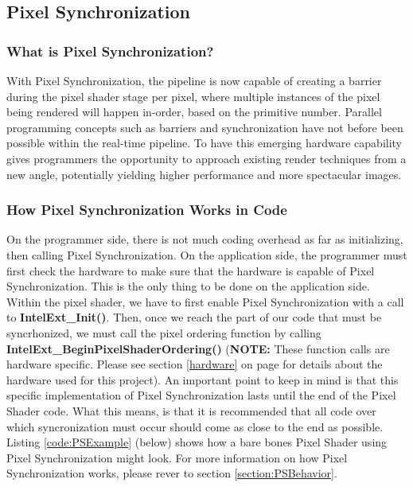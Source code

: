 \documentclass[a4paper, 12pt]{article}
\begin{document}
\subsection{Pixel Synchronization}

\subsubsection{What is Pixel Synchronization?}

With Pixel Synchronization, the pipeline is now capable of creating a barrier
during the pixel shader stage per pixel, where multiple instances of the pixel
being rendered will happen in-order, based on the primitive number. Parallel
programming concepts such as barriers and synchronization have not before been
possible within the real-time pipeline. To have this emerging hardware
capability gives programmers the opportunity to approach existing render
techniques from a new angle, potentially yielding higher performance and more
spectacular images.

\subsubsection{How Pixel Synchronization Works in Code}

\label{section:PixSyncIntro}

\nohyphens{On the programmer side, there is not much coding overhead as far as
initializing, then calling Pixel Synchronization. On the application side, the
programmer must first check the hardware to make sure that the hardware is
capable of Pixel Synchronization. This is the only thing to be done on the
application side. Within the pixel shader, we have to first enable Pixel
Synchronization with a call to \textbf{IntelExt\_Init()}. Then, once we reach
the part of our code that must be syncrhonized, we must call the pixel
ordering function by calling \textbf{IntelExt\_BeginPixelShaderOrdering()}
(\textbf{NOTE:} These function calls are hardware specific. Please see section
\ref{hardware} on page \pageref{hardware} for details about the hardware used
for this project). An important point to keep in mind is that this specific
implementation of Pixel Synchronization lasts until the end of the Pixel
Shader code. What this means, is that it is recommended that all code over
which syncronization must occur should come as close to the end as possible.
Listing \ref{code:PSExample} (below) shows how a bare bones Pixel Shader using
Pixel Synchronization might look. For more information on how Pixel Synchronization works, please rever to section \ref{section:PSBehavior}.}
\end{document}
